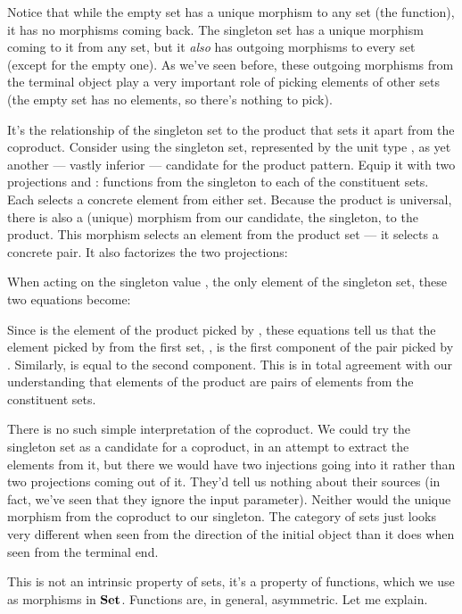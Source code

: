 Notice that while the empty set has a unique morphism to any set (the
 function), it has no morphisms coming back. The
singleton set has a unique morphism coming to it from any set, but it
\emph{also} has outgoing morphisms to every set (except for the empty
one). As we've seen before, these outgoing morphisms from the terminal
object play a very important role of picking elements of other sets (the
empty set has no elements, so there's nothing to pick).

It's the relationship of the singleton set to the product that sets it
apart from the coproduct. Consider using the singleton set, represented
by the unit type \code{()}, as yet another --- vastly inferior ---
candidate for the product pattern. Equip it with two projections
 and : functions from the singleton to each of the
constituent sets. Each selects a concrete element from either set.
Because the product is universal, there is also a (unique) morphism
 from our candidate, the singleton, to the product. This
morphism selects an element from the product set --- it selects a
concrete pair. It also factorizes the two projections:

When acting on the singleton value \code{()}, the only element of the
singleton set, these two equations become:

Since  is the element of the product picked by ,
these equations tell us that the element picked by  from the
first set, , is the first component of the pair picked by
. Similarly,  is equal to the second component.
This is in total agreement with our understanding that elements of the
product are pairs of elements from the constituent sets.

There is no such simple interpretation of the coproduct. We could try
the singleton set as a candidate for a coproduct, in an attempt to
extract the elements from it, but there we would have two injections
going into it rather than two projections coming out of it. They'd tell
us nothing about their sources (in fact, we've seen that they ignore the
input parameter). Neither would the unique morphism from the coproduct
to our singleton. The category of sets just looks very different when
seen from the direction of the initial object than it does when seen
from the terminal end.

This is not an intrinsic property of sets, it's a property of functions,
which we use as morphisms in $\mathbf{Set}$. Functions are, in general,
asymmetric. Let me explain.

